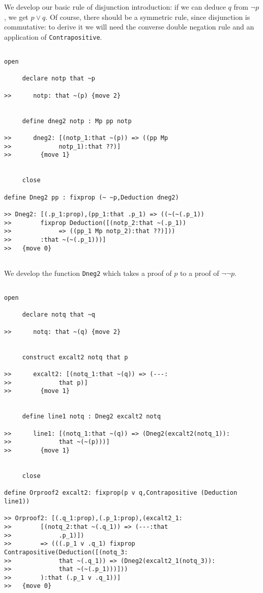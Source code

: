 \documentclass[12pt]{article}
\begin{document}
We develop our basic rule of disjunction introduction:  if we can deduce $q$ from $\neg p$, we get $p \vee q$.  Of course, there should be a symmetric rule, since disjunction is commutative:  to derive it we will need the converse double negation rule and an application of {\tt Contrapositive}.

\begin{verbatim}

open

     declare notp that ~p

>>      notp: that ~(p) {move 2}


     define dneg2 notp : Mp pp notp

>>      dneg2: [(notp_1:that ~(p)) => ((pp Mp 
>>             notp_1):that ??)]
>>        {move 1}


     close

define Dneg2 pp : fixprop (~ ~p,Deduction dneg2)

>> Dneg2: [(.p_1:prop),(pp_1:that .p_1) => ((~(~(.p_1)) 
>>        fixprop Deduction([(notp_2:that ~(.p_1)) 
>>             => ((pp_1 Mp notp_2):that ??)]))
>>        :that ~(~(.p_1)))]
>>   {move 0}


\end{verbatim}

We develop the function {\tt Dneg2} which takes a proof of $p$ to a proof of $\neg \neg p$.

\begin{verbatim}

open

     declare notq that ~q

>>      notq: that ~(q) {move 2}


     construct excalt2 notq that p

>>      excalt2: [(notq_1:that ~(q)) => (---:
>>             that p)]
>>        {move 1}


     define line1 notq : Dneg2 excalt2 notq

>>      line1: [(notq_1:that ~(q)) => (Dneg2(excalt2(notq_1)):
>>             that ~(~(p)))]
>>        {move 1}


     close

define Orproof2 excalt2: fixprop(p v q,Contrapositive (Deduction line1))

>> Orproof2: [(.q_1:prop),(.p_1:prop),(excalt2_1:
>>        [(notq_2:that ~(.q_1)) => (---:that 
>>             .p_1)])
>>        => (((.p_1 v .q_1) fixprop Contrapositive(Deduction([(notq_3:
>>             that ~(.q_1)) => (Dneg2(excalt2_1(notq_3)):
>>             that ~(~(.p_1)))]))
>>        ):that (.p_1 v .q_1))]
>>   {move 0}


\end{verbatim}
\end{document}
